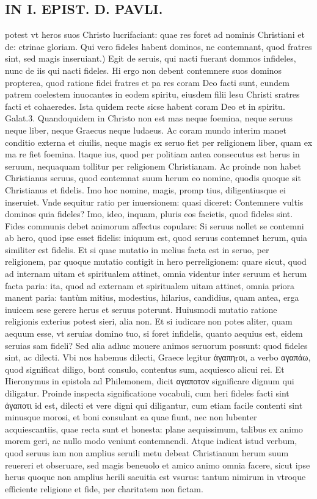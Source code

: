 \documentclass{article}
\begin{document}
\begin{pages}
\section*{IN I. EPIST. D. PAVLI. }
\marginpar{[ p.121 ]}\pstart potest vt heros suos Christo lucrifaciant: quae res foret ad nominis Christiani et de: ctrinae gloriam.  \pend\pstart Qui vero fideles habent dominos, ne contemnant, quod fratres sint, sed magis inseruiant.) Egit de seruis, qui nacti fuerant dommos infideles, nunc de iis qui nacti fideles. Hi ergo non debent contemnere suos dominos propterea, quod ratione fidei fratres et pa res coram Deo facti sunt, eundem patrem coelestem inuocantes in eodem spiritu, eiusdem filii lesu Christi sratres facti et cohaeredes. Ista quidem recte sicse habent coram Deo et in spiritu. Galat.3. Quandoquidem in Christo non est mas neque foemina, neque seruus neque liber, neque Graecus neque ludaeus. Ac coram mundo interim manet conditio externa et ciuilis, neque magis ex seruo fiet per religionem liber, quam ex ma re fiet foemina. ltaque ius, quod per politiam antea consecutus est herus in seruum, nequaquam tollitur per religionem Christianam. Ac proinde non habet Christianus seruus, quod contemnat suum herum eo nomine, quodis quoque sit Christianus et fidelis. Imo hoc nomine, magis, promp tius, diligentiusque ei inseruiet. Vnde sequitur ratio per inuersionem: quasi diceret: Contemnere vultis dominos quia fideles? Imo, ideo, inquam, pluris eos facietis, quod fideles sint. Fides communis debet animorum affectus copulare: Si seruus nollet se contemni ab hero, quod ipse esset fidelis: iniquum est, quod seruus contemnet herum, quia similiter est fidelis. Et si quae mutatio in melius facta est in seruo, per religionem, par quoque mutatio contigit in hero perreligionem: quare sicut, quod ad internam uitam et spiritualem attinet, omnia videntur inter seruum et herum facta paria: ita, quod ad externam et spiritualem uitam attinet, omnia priora manent paria: tantùm mitius, modestius, hilarius, candidius, quam antea, erga inuicem sese gerere herus et seruus poterunt. Huiusmodi mutatio ratione religionis exterius potest sieri, alia non. Et si iudicare non potes aliter, quam aequum esse, vt seruias domino tuo, si foret infidelis, quanto aequius est, eidem seruias sam fideli? Sed alia adhuc mouere animos seruorum possunt: quod fideles sint, ac dilecti. Vbi nos habemus dilecti, Graece legitur ἀγαπηrοι, a verbo αγαπάω, quod significat diligo, bont consulo, contentus sum, acquiesco alicui rei. Et Hieronymus in epistola ad Philemonem, dicit αγαποτον significare dignum qui diligatur. Proinde inspecta significatione vocabuli, cum heri fideles facti sint ἀγαποτι id est, dilecti et vere digni qui diligantur, cum etiam facile contenti sint minusque morosi, et boni consulant ea quae fiunt, nec non lubenter acquiescantiis, quae recta sunt et honesta: plane aequissimum, talibus ex animo morem geri, ac nullo modo veniunt contemnendi. Atque indicat istud verbum, quod seruus iam non amplius seruili metu debeat Christianum herum suum reuereri et obseruare, sed magis beneuolo et amico animo omnia facere, sicut ipse herus quoque non amplius herili saeuitia est vsurus: tantum nimirum in vtroque efficiente religione et fide, per charitatem non fictam. 
\end{pages}
\end{document}
